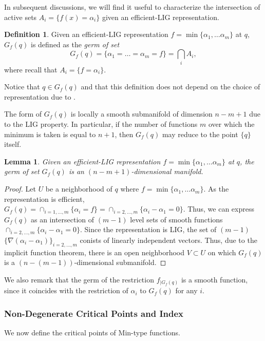 \documentclass[11pt]{article}
\theoremstyle{plain}
\newtheorem{lem}{Lemma}
\theoremstyle{definition}
\newtheorem{defi}{Definition}
\theoremstyle{remark}
\begin{document}
In subsequent discussions, we will find it useful to characterize the intersection of active sets $A_i = \{ f(x) = \alpha_i \}$ given an efficient-LIG representation. 

\begin{defi}
	\label{def:G(x)}
	Given an efficient-LIG representation $f = \min \{\alpha_1, \ldots \alpha_m\}$ at $q$,  $G_f(q)$ is defined as the \emph{germ of set}
$$
		G_f(q) = \{\alpha_1 = \ldots = \alpha_m = f\} = \bigcap_i A_i,
$$
where recall that $A_i = \{f = \alpha_i\}$. 
\end{defi}
Notice that $q \in G_f(q)$ and that this definition does not depend on the choice of representation due to .

The form of $G_f(q)$ is locally a smooth submanifold of dimension $n-m+1$ due to the LIG property. In particular, if the number of functions $m$ over which the minimum is taken is equal to $n+1$, then $G_f(q)$ may reduce to the point $\{q\}$ itself.

\begin{lem} \label{lem:G(q)_mfd} Given an efficient-LIG representation $f = \min \{\alpha_1, \ldots \alpha_m \}$ at $q$, the germ of set $G_f(q)$ is an $(n-m+1)$-dimensional manifold. 
\end{lem}

\begin{proof}
Let $U$ be a neighborhood of $q$ where $f = \min \{\alpha_1, \ldots \alpha_m \}$. As the representation is efficient, $G_f(q) = \cap_{i = 1, \ldots, m} \{\alpha_i = f\} = \cap_{i= 2,\ldots,m}\{\alpha_i - \alpha_1 = 0\}$. Thus, we can express $G_f(q)$ as an intersection of $(m-1)$ level sets of smooth functions $\cap_{i= 2,\ldots,m}\{\alpha_i - \alpha_1 = 0\}$. Since the representation is LIG, the set of $(m-1)$ $\{\nabla (\alpha_i - \alpha_1)\}_{i = 2,\ldots, m}$ conists of linearly independent vectors. Thus, due to the implicit function theorem, there is an open neighborhood $V \subset U$ on which $G_f(q)$ is a $(n-(m-1))$-dimensional submanifold.
\end{proof}

We also remark that the germ of the restriction $f_{|G_f(q)}$ is a smooth function, since it coincides with the restriction of  $\alpha_i$ to $G_f(q)$ for any $i$.

\subsubsection{Non-Degenerate Critical Points and Index}
We now define the critical points of Min-type functions.
\end{document}
